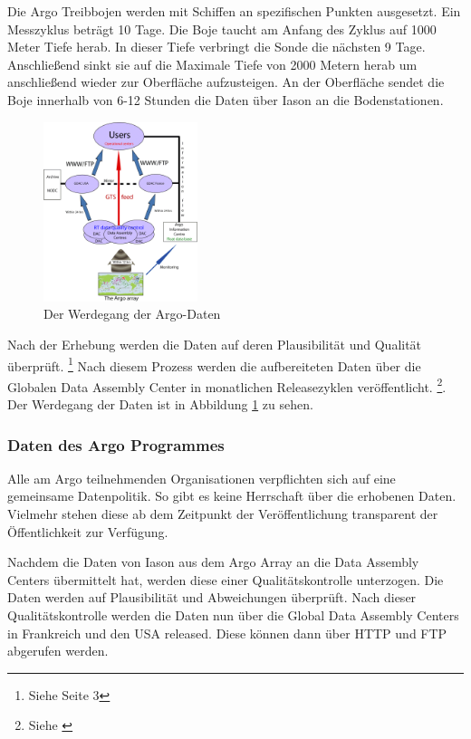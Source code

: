     
    Die Argo Treibbojen werden mit Schiffen an spezifischen Punkten ausgesetzt. Ein Messzyklus beträgt 10 Tage. Die Boje taucht am Anfang des Zyklus auf 1000 Meter Tiefe herab.  In dieser Tiefe verbringt die Sonde die nächsten 9 Tage. Anschließend sinkt sie auf die Maximale Tiefe von 2000 Metern herab um anschließend wieder zur Oberfläche aufzusteigen. An der Oberfläche sendet die Boje innerhalb von 6-12 Stunden die Daten über Iason an die Bodenstationen.
   
    
    

    \begin{figure}[!ht]
        \centering
        \includegraphics[width=0.4\textwidth]{pix/RT-Data-flow}
        \caption[Der Werdegang der Argo-Daten - Bildquelle: http://www.argo.ucsd.edu]{Der Werdegang der Argo-Daten}
        \label{fig:argo_dataflow}
    \end{figure}
    
    Nach der Erhebung werden die Daten auf deren Plausibilität und Qualität überprüft. \footnote{Siehe \cite{ArgoDataBeginnersGuide} Seite 3} Nach diesem Prozess werden die aufbereiteten Daten über die Globalen Data Assembly Center in monatlichen Releasezyklen veröffentlicht. \footnote{Siehe \cite{Argofloa92:online}}. Der Werdegang der Daten ist in Abbildung \ref{fig:argo_dataflow} zu sehen.
    
    \subsubsection{Daten des Argo Programmes}
    

    Alle am Argo teilnehmenden Organisationen verpflichten sich auf eine gemeinsame Datenpolitik. So gibt es keine Herrschaft über die erhobenen Daten. Vielmehr stehen diese ab dem Zeitpunkt der Veröffentlichung transparent der Öffentlichkeit zur Verfügung.
    
    Nachdem die Daten von Iason aus dem Argo Array an die Data Assembly Centers übermittelt hat, werden diese einer Qualitätskontrolle unterzogen. Die Daten werden auf Plausibilität und Abweichungen überprüft. Nach dieser Qualitätskontrolle werden die Daten nun über die Global Data Assembly Centers in Frankreich und den USA released. Diese können dann über HTTP und FTP abgerufen werden. 
    
